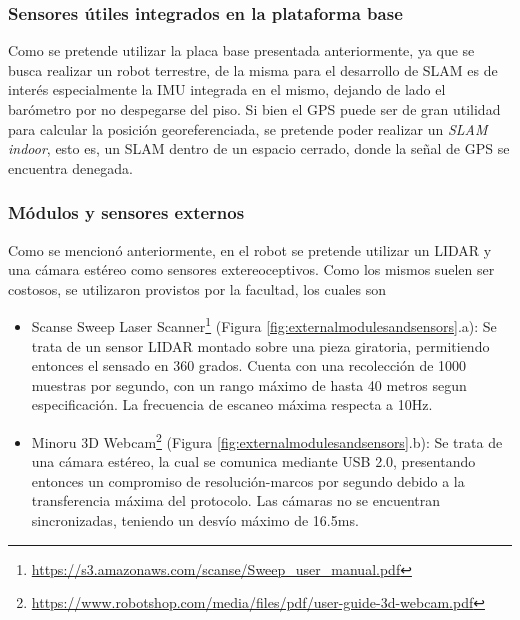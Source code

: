 \subsubsection{Sensores útiles integrados en la plataforma base}
Como se pretende utilizar la placa base presentada anteriormente, ya que se busca realizar un robot terrestre, de la misma para el desarrollo de SLAM es de interés especialmente la IMU integrada en el mismo, dejando de lado el barómetro por no despegarse del piso. Si bien el GPS puede ser de gran utilidad para calcular la posición georeferenciada, se pretende poder realizar un \textit{SLAM indoor}, esto es, un SLAM dentro de un espacio cerrado, donde la señal de GPS se encuentra denegada.

\subsubsection{Módulos y sensores externos}
Como se mencionó anteriormente, en el robot se pretende utilizar un LIDAR y una cámara estéreo como sensores extereoceptivos. Como los mismos suelen ser costosos, se utilizaron provistos por la facultad, los cuales son
\begin{itemize}
    \item Scanse Sweep Laser Scanner\footnote{\url{https://s3.amazonaws.com/scanse/Sweep_user_manual.pdf}} (Figura \ref{fig:externalmodulesandsensors}.a): Se trata de un sensor LIDAR montado sobre una pieza giratoria, permitiendo entonces el sensado en 360 grados. Cuenta con una recolección de 1000 muestras por segundo, con un rango máximo de hasta 40 metros segun especificación. La frecuencia de escaneo máxima respecta a 10Hz.
    \item Minoru 3D Webcam\footnote{\url{https://www.robotshop.com/media/files/pdf/user-guide-3d-webcam.pdf}} (Figura \ref{fig:externalmodulesandsensors}.b): Se trata de una cámara estéreo, la cual se comunica mediante USB 2.0, presentando entonces un compromiso de resolución-marcos por segundo debido a la transferencia máxima del protocolo. Las cámaras no se encuentran sincronizadas, teniendo un desvío máximo de 16.5ms.
\end{itemize}
